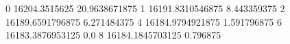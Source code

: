 0 16204.3515625 20.9638671875
1 16191.8310546875 8.443359375
2 16189.6591796875 6.271484375
4 16184.9794921875 1.591796875
6 16183.3876953125 0.0
8 16184.1845703125 0.796875
